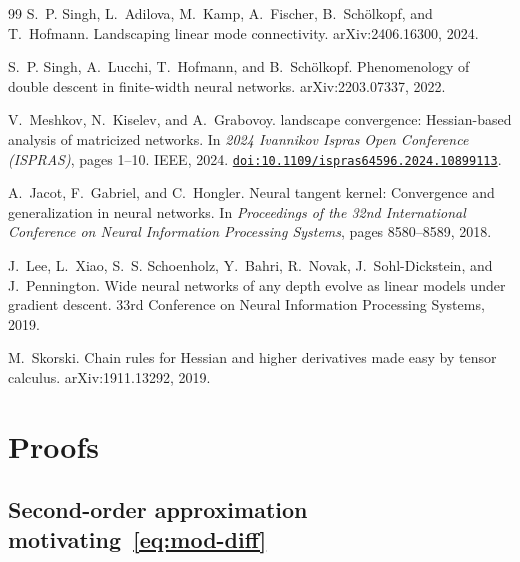 \documentclass[10pt,letterpaper]{article}
\theoremstyle{definition}
\begin{document}
\begin{thebibliography}{99}
S.~P. Singh, L.~Adilova, M.~Kamp, A.~Fischer, B.~Sch{\"o}lkopf, and T.~Hofmann.
\newblock Landscaping linear mode connectivity.
\newblock arXiv:2406.16300, 2024.

S.~P. Singh, A.~Lucchi, T.~Hofmann, and B.~Sch{\"o}lkopf.
\newblock Phenomenology of double descent in finite-width neural networks.
\newblock arXiv:2203.07337, 2022.

V.~Meshkov, N.~Kiselev, and A.~Grabovoy.
 landscape convergence: {H}essian-based analysis of matricized networks.
\newblock In \emph{2024 Ivannikov Ispras Open Conference (ISPRAS)}, pages 1--10. IEEE, 2024.
\newblock \href{https://doi.org/10.1109/ispras64596.2024.10899113}{\texttt{doi:10.1109/ispras64596.2024.10899113}}.

A.~Jacot, F.~Gabriel, and C.~Hongler.
\newblock Neural tangent kernel: Convergence and generalization in neural networks.
\newblock In \emph{Proceedings of the 32nd International Conference on Neural Information Processing Systems}, pages 8580--8589, 2018.

J.~Lee, L.~Xiao, S.~S. Schoenholz, Y.~Bahri, R.~Novak, J.~Sohl-Dickstein, and J.~Pennington.
\newblock Wide neural networks of any depth evolve as linear models under gradient descent.
\newblock 33rd Conference on Neural Information Processing Systems, 2019.

M.~Skorski.
\newblock Chain rules for Hessian and higher derivatives made easy by tensor calculus.
\newblock arXiv:1911.13292, 2019.

\end{thebibliography}

\appendix

\section{Proofs}

\subsection{Second-order approximation motivating~\eqref{eq:mod-diff}}\label{app:proof-mod-diff}
\end{document}
